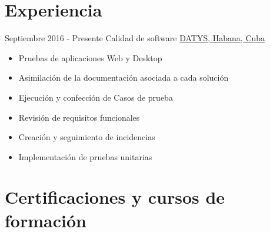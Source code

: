 \documentclass[letterpaper]{twentysecondcv} %
\begin{document}
\makeprofile %
 

\section{Experiencia}

\begin{twenty} %
\twentyitem
    	{Septiembre 2016 -}
		{Presente}
        {Calidad de software}
        {\href{http://datys.cu/}{DATYS, Habana, Cuba}}
        {}
        {
        {\begin{itemize}
        \item Pruebas de aplicaciones Web y Desktop
        \item Asimilación de la documentación asociada a cada solución
        \item Ejecución y confección de Casos de prueba
        \item Revisión de requisitos funcionales 
        \item Creación y seguimiento de incidencias
        \item Implementación de pruebas unitarias 
        \end{itemize}}
        }
        
\end{twenty}

\section{Certificaciones y cursos de formación}
\end{document}
